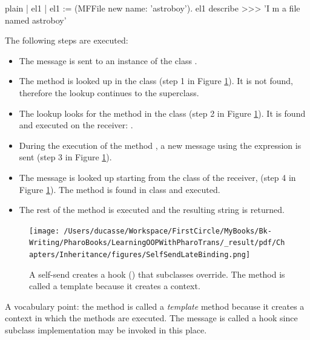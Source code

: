 \documentclass[10pt,twoside,english]{_support/latex/sbabook/sbabook}
\begin{document}
\begin{displaycode}{plain}
| el1 |
el1 := (MFFile new name: 'astroboy').
el1 describe
>>> 'I m a file named astroboy'
\end{displaycode}

The following steps are executed: 

\begin{itemize}
\item The message  is sent to  an instance of the class . 
\item The method  is looked up in the class  (step 1 in Figure \ref{fig:SelfSendLateBinding}). It is not found, therefore the lookup continues to the superclass. 
\item The lookup looks for the method  in the class   (step 2 in Figure \ref{fig:SelfSendLateBinding}). It is found and executed on the receiver: . 
\item During the execution of the method , a new message  using the expression  is sent (step 3 in Figure \ref{fig:SelfSendLateBinding}).
\item The message  is looked up starting from the class of the receiver,  (step 4 in Figure \ref{fig:SelfSendLateBinding}). The method  is found in class  and executed. 
\item The rest of the method  is executed and the resulting string is returned.
\end{itemize}


\begin{figure}

\begin{center}
\texttt{[image: /Users/ducasse/Workspace/FirstCircle/MyBooks/Bk-Writing/PharoBooks/LearningOOPWithPharoTrans/\_result/pdf/Chapters/Inheritance/figures/SelfSendLateBinding.png]}\caption{A self-send creates a hook () that subclasses override. The method  is called a template because it creates a context.\label{fig:SelfSendLateBinding}}\end{center}
\end{figure}


A vocabulary point: the method  is called a \textit{template} method because it creates a context in which the  methods are executed. The message  is called a hook since subclass implementation may be invoked in this place.
\end{document}
